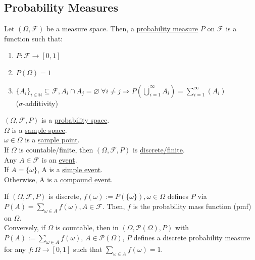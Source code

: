 \documentclass{article}
\begin{document}
	\newpage\subsection{Probability Measures}
	
	\begin{mydef}{}{}
		Let $(\Omega, \mathcal{F})$ be a measure space. Then, a \underline{probability measure} $P$ on $\mathcal{F}$ is a function such that:
		\begin{enumerate}[label=(\roman*)]
			\item $P : \mathcal{F}\to[0, 1]$
			\item $P(\Omega)=1$
			\item $\{A_i\}_{i\in\mathbb{N}}\subseteq\mathcal{F}, A_i\cap A_j=\varnothing\;\forall i\neq j\Rightarrow P(\dot\bigcup_{i=1}^{\infty}A_i)=\sum_{i=1}^{\infty}(A_i)$\\($\sigma$-additivity)
		\end{enumerate}
		
		$(\Omega, \mathcal{F}, P)$ is a \underline{probability space}.\\
		
		$\Omega$ is a \underline{sample space}.\\
		
		$\omega\in\Omega$ is a \underline{sample point}.\\
		
		If $\Omega$ is countable/finite, then $(\Omega, \mathcal{F}, P)$ is \underline{discrete/finite}.\\
		
		Any $A\in\mathcal{F}$ is an \underline{event}.\\
		
		If $A=\{\omega\}$, A is a \underline{simple event}.\\
		
		Otherwise, A is a \underline{compound event}.\\
	\end{mydef}
	
	\begin{myrem}{}{}
		If $(\Omega, \mathcal{F}, P)$ is discrete, $f(\omega):=P(\{\omega\}), \omega\in\Omega$ defines $P$ via $P(A)=\sum_{\omega\in A}f(\omega), A\in\mathcal{F}$. Then, $f$ is the probability mass function (pmf) on $\Omega$.\\
		
		Conversely, if $\Omega$ is countable, then in $(\Omega, \mathcal{P}(\Omega), P)$ with $P(A):=\sum_{\omega\in A}f(\omega)$, $A\in\mathcal{P}(\Omega)$, $P$ defines a discrete probability measure for any $f : \Omega\to[0, 1]$ such that $\sum_{\omega\in A}f(\omega)=1$.
	\end{myrem}
	
\end{document}
